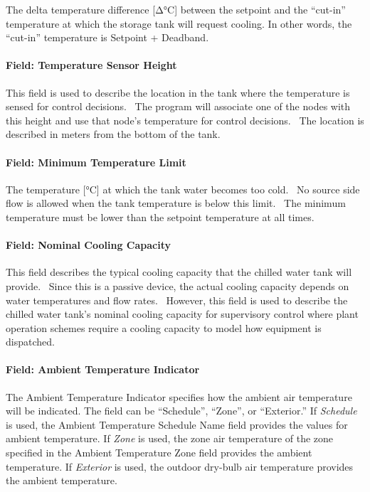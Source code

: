 The delta temperature difference {[}Δ°C{]} between the setpoint and the ``cut-in'' temperature at which the storage tank will request cooling. In other words, the ``cut-in'' temperature is Setpoint + Deadband.

\paragraph{Field: Temperature Sensor Height}\label{field-temperature-sensor-height}

This field is used to describe the location in the tank where the temperature is sensed for control decisions.~ The program will associate one of the nodes with this height and use that node's temperature for control decisions.~ The location is described in meters from the bottom of the tank.

\paragraph{Field: Minimum Temperature Limit}\label{field-minimum-temperature-limit-1}

The temperature {[}°C{]} at which the tank water becomes too cold.~ No source side flow is allowed when the tank temperature is below this limit.~ The minimum temperature must be lower than the setpoint temperature at all times.

\paragraph{Field: Nominal Cooling Capacity}\label{field-nominal-cooling-capacity-3}

This field describes the typical cooling capacity that the chilled water tank will provide.~ Since this is a passive device, the actual cooling capacity depends on water temperatures and flow rates.~ However, this field is used to describe the chilled water tank's nominal cooling capacity for supervisory control where plant operation schemes require a cooling capacity to model how equipment is dispatched.

\paragraph{Field: Ambient Temperature Indicator}\label{field-ambient-temperature-indicator-1}

The Ambient Temperature Indicator specifies how the ambient air temperature will be indicated. The field can be ``Schedule'', ``Zone'', or ``Exterior.'' If \emph{Schedule} is used, the Ambient Temperature Schedule Name field provides the values for ambient temperature. If \emph{Zone} is used, the zone air temperature of the zone specified in the Ambient Temperature Zone field provides the ambient temperature. If \emph{Exterior} is used, the outdoor dry-bulb air temperature provides the ambient temperature.

